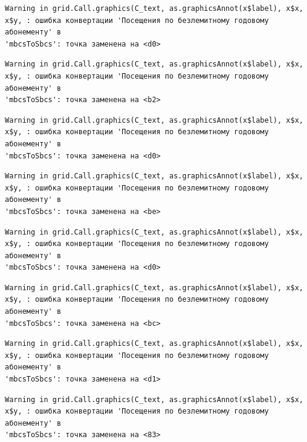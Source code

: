 \documentclass[
  letterpaper,
  DIV=11,
  numbers=noendperiod]{scrreprt}
\begin{document}
\begin{verbatim}
Warning in grid.Call.graphics(C_text, as.graphicsAnnot(x$label), x$x,
x$y, : ошибка конвертации 'Посещения по безлемитному годовому абонементу' в
'mbcsToSbcs': точка заменена на <d0>
\end{verbatim}

\begin{verbatim}
Warning in grid.Call.graphics(C_text, as.graphicsAnnot(x$label), x$x,
x$y, : ошибка конвертации 'Посещения по безлемитному годовому абонементу' в
'mbcsToSbcs': точка заменена на <b2>
\end{verbatim}

\begin{verbatim}
Warning in grid.Call.graphics(C_text, as.graphicsAnnot(x$label), x$x,
x$y, : ошибка конвертации 'Посещения по безлемитному годовому абонементу' в
'mbcsToSbcs': точка заменена на <d0>
\end{verbatim}

\begin{verbatim}
Warning in grid.Call.graphics(C_text, as.graphicsAnnot(x$label), x$x,
x$y, : ошибка конвертации 'Посещения по безлемитному годовому абонементу' в
'mbcsToSbcs': точка заменена на <be>
\end{verbatim}

\begin{verbatim}
Warning in grid.Call.graphics(C_text, as.graphicsAnnot(x$label), x$x,
x$y, : ошибка конвертации 'Посещения по безлемитному годовому абонементу' в
'mbcsToSbcs': точка заменена на <d0>
\end{verbatim}

\begin{verbatim}
Warning in grid.Call.graphics(C_text, as.graphicsAnnot(x$label), x$x,
x$y, : ошибка конвертации 'Посещения по безлемитному годовому абонементу' в
'mbcsToSbcs': точка заменена на <bc>
\end{verbatim}

\begin{verbatim}
Warning in grid.Call.graphics(C_text, as.graphicsAnnot(x$label), x$x,
x$y, : ошибка конвертации 'Посещения по безлемитному годовому абонементу' в
'mbcsToSbcs': точка заменена на <d1>
\end{verbatim}

\begin{verbatim}
Warning in grid.Call.graphics(C_text, as.graphicsAnnot(x$label), x$x,
x$y, : ошибка конвертации 'Посещения по безлемитному годовому абонементу' в
'mbcsToSbcs': точка заменена на <83>
\end{verbatim}
\end{document}
